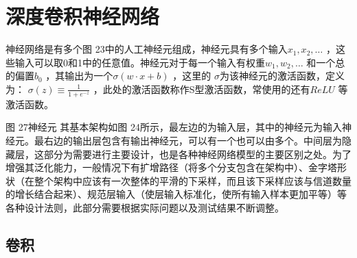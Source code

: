 
\section{深度卷积神经网络}






神经网络是有多个图 23中的人工神经元组成，神经元具有多个输入$x_1,x_2,\dots $ ，这些输入可以取0和1中的任意值。神经元对于每一个输入有权重$w_1,w_2,\dots $ 和一个总的偏置$b_0$ ，其输出为一个$\sigma(w\cdot x + b)$ ，这里的 $\sigma$为该神经元的激活函数，定义为：
$\sigma(z)\equiv\frac{1}{1+e^{-z}}$
，此处的激活函数称作S型激活函数，常使用的还有$ReLU $ 等激活函数。

图 27神经元
其基本架构如图 24所示，最左边的为输入层，其中的神经元为输入神经元。最右边的输出层包含有输出神经元，可以有一个也可以由多个。中间层为隐藏层，这部分为需要进行主要设计，也是各种神经网络模型的主要区别之处。为了增强其泛化能力，一般情况下有扩增路径（将多个分支包含在架构中）、金字塔形状（在整个架构中应该有一次整体的平滑的下采样，而且该下采样应该与信道数量的增长结合起来）、规范层输入（使层输入标准化，使所有输入样本更加平等）等各种设计法则，此部分需要根据实际问题以及测试结果不断调整。

\subsection{卷积}

